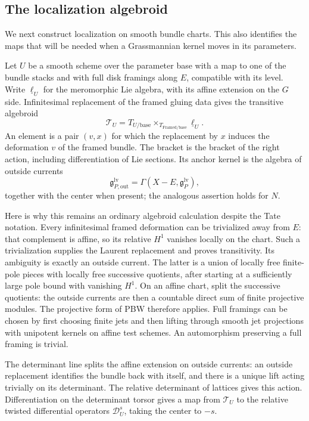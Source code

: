 \subsection{The localization algebroid}

We next construct localization on smooth bundle charts.  This also
identifies the maps that will be needed when a Grassmannian kernel
moves in its parameters.

Let $U$ be a smooth scheme over the parameter base with a map to one
of the bundle stacks and with full disk framings along $E$, compatible
with its level.  Write $\underline\ell_U$ for the meromorphic Lie
algebra, with its affine extension on the $G$ side.  Infinitesimal
replacement of the framed gluing data gives the transitive algebroid
\[
 \mathcal T_U
   =T_{U/\mathrm{base}}
       \mathop{\times}_{T_{\mathrm{Framed}/\mathrm{base}}}
                   \underline\ell_U.
\]
An element is a pair $(v,x)$ for which the replacement by $x$ induces
the deformation $v$ of the framed bundle.  The bracket is the bracket
of the right action, including differentiation of Lie sections.
Its anchor kernel is the algebra of outside currents
\[
 \mathfrak g^{\mathrm{lv}}_{P,\mathrm{out}}
       =\Gamma(X-E,\mathfrak g^{\mathrm{lv}}_P),
\]
together with the center when present; the analogous assertion holds
for $N$.

Here is why this remains an ordinary algebroid calculation despite the
Tate notation.  Every infinitesimal framed deformation can be
trivialized away from $E$: that complement is affine, so its relative
$H^1$ vanishes locally on the chart.  Such a trivialization supplies
the Laurent replacement and proves transitivity.  Its ambiguity is
exactly an outside current.  The latter is a union of locally free
finite-pole pieces with locally free successive quotients, after
starting at a sufficiently large pole bound with vanishing $H^1$.
On an affine chart, split the successive quotients: the outside
currents are then a countable direct sum of finite projective modules.
The projective form of PBW therefore applies.  Full framings can be chosen by first choosing finite jets and then lifting
through smooth jet projections with unipotent kernels on affine test
schemes.  An automorphism preserving a full framing is trivial.

The determinant line splits the affine extension on outside currents:
an outside replacement identifies the bundle back with itself, and
there is a unique lift acting trivially on its determinant.  The
relative determinant of lattices gives this action.  Differentiation
on the determinant torsor gives a map from $\mathcal T_U$ to the
relative twisted differential operators $\mathscr D_U^s$, taking the
center to $-s$.

